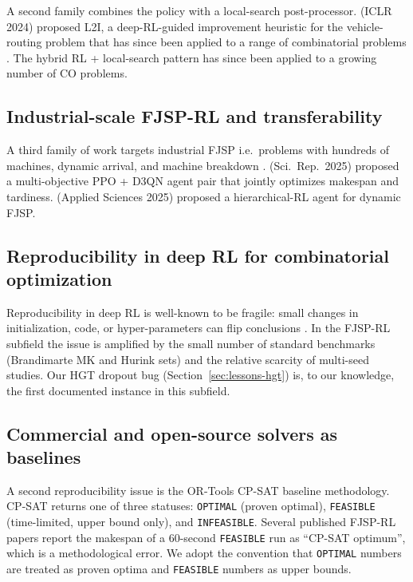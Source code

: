 \documentclass[preprint,review,3p,times,twocolumn]{elsarticle}
\newcommand{\ie}{i.e.\!}
\begin{document}
A second family combines the policy with a local-search
post-processor. \citet{Zhang2024L2I} (ICLR 2024) proposed
L2I, a deep-RL-guided improvement heuristic for the
vehicle-routing problem that has since been applied to a
range of combinatorial problems
\citep{Hottung2022, Zhang2024L2I}. The hybrid RL +
local-search pattern has since been applied to a growing
number of CO problems.

\subsection{Industrial-scale FJSP-RL and transferability}

A third family of work targets industrial FJSP
\ie\ problems with hundreds of machines, dynamic arrival,
and machine breakdown
\citep{Islam2017, Henderson2018}. \citet{Li2025MultiObj}
(Sci.\ Rep.\ 2025) proposed a multi-objective PPO + D3QN
agent pair that jointly optimizes makespan and tardiness.
\citet{Zhang2025HRL} (Applied Sciences 2025) proposed a
hierarchical-RL agent for dynamic FJSP.

\subsection{Reproducibility in deep RL for combinatorial optimization}

Reproducibility in deep RL is well-known to be fragile:
small changes in initialization, code, or hyper-parameters
can flip conclusions \citep{Islam2017, Henderson2018}. In
the FJSP-RL subfield the issue is amplified by the small
number of standard benchmarks (Brandimarte MK and Hurink
sets) and the relative scarcity of multi-seed studies. Our
HGT dropout bug (Section~\ref{sec:lessons-hgt}) is, to our
knowledge, the first documented instance in this subfield.

\subsection{Commercial and open-source solvers as baselines}

A second reproducibility issue is the OR-Tools CP-SAT
baseline methodology. CP-SAT returns one of three statuses:
\texttt{OPTIMAL} (proven optimal), \texttt{FEASIBLE}
(time-limited, upper bound only), and \texttt{INFEASIBLE}.
Several published FJSP-RL papers report the makespan of a
60-second \texttt{FEASIBLE} run as ``CP-SAT optimum'',
which is a methodological error. We adopt the convention
that \texttt{OPTIMAL} numbers are treated as proven optima
and \texttt{FEASIBLE} numbers as upper bounds.
\end{document}
